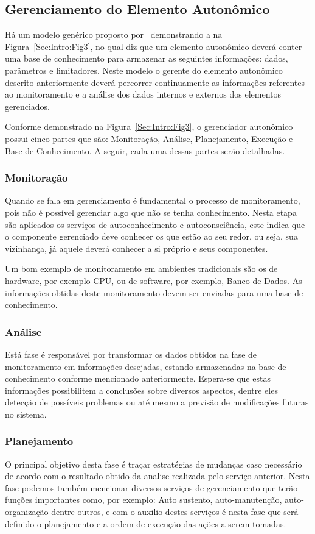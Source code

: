 \documentclass[11pt,twoside]{article}
\begin{document}
\subsection{Gerenciamento do Elemento Autonômico}
Há um modelo genérico proposto por~\cite{KEPHART} demonstrando a na Figura~\ref{Sec:Intro:Fig3}, no qual diz que um elemento autonômico deverá conter uma base de conhecimento para armazenar as seguintes informações: dados, parâmetros e limitadores. Neste modelo o gerente do elemento autonômico descrito anteriormente deverá percorrer continuamente as informações referentes ao monitoramento e a análise dos dados internos e externos dos elementos gerenciados.

Conforme demonstrado na Figura~\ref{Sec:Intro:Fig3}, o gerenciador autonômico possui cinco partes que são: Monitoração, Análise, Planejamento, Execução e Base de Conhecimento. A seguir, cada uma dessas partes serão detalhadas.

\subsubsection{Monitoração} 
Quando se fala em gerenciamento é fundamental o processo de monitoramento, pois não é possível gerenciar algo que não se tenha conhecimento. Nesta etapa são aplicados os serviços de autoconhecimento e autoconsciência, este indica que o componente gerenciado deve conhecer os que estão ao seu redor, ou seja, sua vizinhança, já aquele deverá conhecer a si próprio e seus componentes. 

Um bom exemplo de monitoramento em ambientes tradicionais são os de hardware, por exemplo CPU, ou de software, por exemplo, Banco de Dados. As informações obtidas deste monitoramento devem ser enviadas para uma base de conhecimento.

\subsubsection{Análise}
Está fase é responsável por transformar os dados obtidos na fase de monitoramento em informações desejadas, estando armazenadas na base de conhecimento conforme mencionado anteriormente. Espera-se que estas informações possibilitem a conclusões sobre diversos aspectos, dentre eles detecção de possíveis problemas ou até mesmo a previsão de modificações futuras no sistema.

\subsubsection{Planejamento}
O principal objetivo desta fase é traçar estratégias de mudanças caso necessário de acordo com o resultado obtido da analise realizada pelo serviço anterior. Nesta fase podemos também mencionar diversos serviços de gerenciamento que terão funções importantes como, por exemplo: Auto sustento, auto-manutenção, auto-organização dentre outros, e com o auxilio destes serviços é nesta fase que será definido o planejamento e a ordem de execução das ações a serem tomadas.
\end{document}

